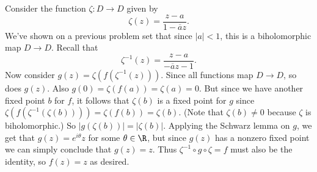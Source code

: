 \documentclass[11pt,letterpaper]{article}
\begin{document}
\begin{solution}
    Consider the function $\zeta : D \to D$ given by
    \[
        \zeta(z)=\frac{z-a}{1-\overline{a}z}.
    \] 
    We've shown on a previous problem set that since $|a|<1$, this is a biholomorphic map $D \to D$. Recall that
    \[
        \zeta^{-1}(z) = \frac{z-a}{-\overline{a}z-1}.
    \] 
    Now consider $g(z) = \zeta(f(\zeta^{-1}(z)))$. Since all functions map $D \to D$, so does $g(z)$. Also $g(0)=\zeta(f(a))=\zeta(a)=0$. But since we have another fixed point $b$ for $f$, it follows that $\zeta(b)$ is a fixed point for $g$ since $\zeta(f(\zeta^{-1}(\zeta(b))))=\zeta(f(b))=\zeta(b)$. (Note that $\zeta(b)\neq 0$ because $\zeta$ is biholomorphic.) So $|g(\zeta(b))|=|\zeta(b)|$. Applying the Schwarz lemma on $g$, we get that $g(z)=e^{i\theta}z$ for some $\theta\in \R$,
    but since $g(z)$ has a nonzero fixed point we can simply conclude that $g(z)=z$. Thus $\zeta^{-1}\circ g\circ \zeta=f$ must also be the identity, so $f(z)=z$ as desired.
\end{solution}
\end{document}
